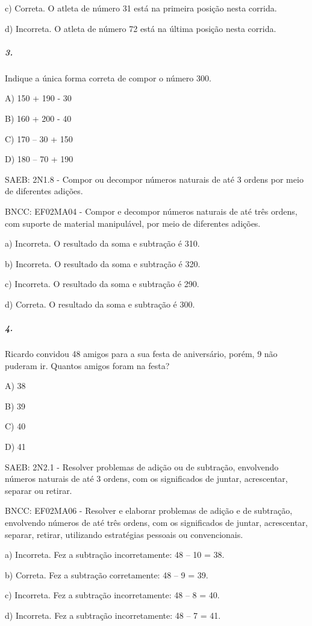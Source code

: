 c) Correta. O atleta de número 31 está na primeira posição nesta
corrida.

d) Incorreta. O atleta de número 72 está na última posição nesta
corrida.

\subparagraph{3. }\label{section-132}

Indique a única forma correta de compor o número 300.

A) 150 + 190 - 30

B) 160 + 200 - 40

C) 170 -- 30 + 150

D) 180 -- 70 + 190

SAEB: 2N1.8 - Compor ou decompor números naturais de até 3 ordens por
meio de diferentes adições.

BNCC: EF02MA04 - Compor e decompor números naturais de até três ordens,
com suporte de material manipulável, por meio de diferentes adições.

a) Incorreta. O resultado da soma e subtração é 310.

b) Incorreta. O resultado da soma e subtração é 320.

c) Incorreta. O resultado da soma e subtração é 290.

d) Correta. O resultado da soma e subtração é 300.

\subparagraph{4. }\label{section-133}

Ricardo convidou 48 amigos para a sua festa de aniversário, porém, 9 não
puderam ir. Quantos amigos foram na festa?

A) 38

B) 39

C) 40

D) 41

SAEB: 2N2.1 - Resolver problemas de adição ou de subtração, envolvendo
números naturais de até 3 ordens, com os significados de juntar,
acrescentar, separar ou retirar.

BNCC: EF02MA06 - Resolver e elaborar problemas de adição e de subtração,
envolvendo números de até três ordens, com os significados de juntar,
acrescentar, separar, retirar, utilizando estratégias pessoais ou
convencionais.

a) Incorreta. Fez a subtração incorretamente: 48 -- 10 = 38.

b) Correta. Fez a subtração corretamente: 48 -- 9 = 39.

c) Incorreta. Fez a subtração incorretamente: 48 -- 8 = 40.

d) Incorreta. Fez a subtração incorretamente: 48 -- 7 = 41.

